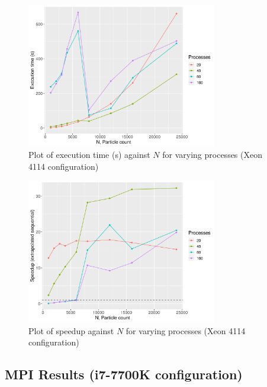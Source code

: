 \documentclass[12pt]{article}
\begin{document}
\begin{figure}[H]
    \centering
    \includegraphics[width=0.74\textwidth]{processedCpuResults/PureXeS-varyNandProcesses.png}
    \caption{Plot of execution time (s) against $N$ for varying processes (Xeon 4114 configuration)}
    \label{fig:PureXeS-varyNandProcesses}
\end{figure}

\begin{figure}[H]
    \centering
    \includegraphics[width=0.74\textwidth]{processedCpuResults/PureXeS-seqSpeedup.png}
    \caption{Plot of speedup against $N$ for varying processes (Xeon 4114 configuration)}
    \label{fig:PureXeS-seqSpeedup}
\end{figure}

\subsection{MPI Results (i7-7700K configuration)}
\end{document}
